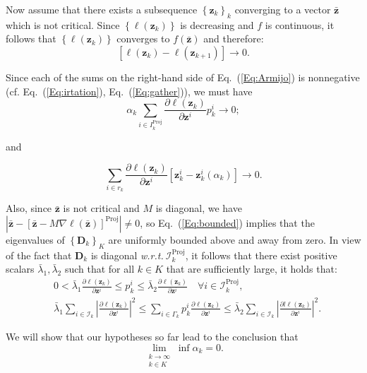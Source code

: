 \documentclass{article}
\theoremstyle{plain}
\theoremstyle{definition}
\def \wrt {\textit{w.r.t.}$\ $}
\def \sI {\mathcal{I}}
\def \D {\mathbf{D}}
\def \z {\mathbf{z}}
\begin{document}
Now assume that there exists a subsequence \(\left\{\z_k\right\}_k\) converging to a vector \(\bar{\z}\) which is not critical. Since \(\left\{\ell\left(\z_k\right)\right\}\) is decreasing and \(f\) is continuous, it follows that \(\left\{\ell\left(\z_k\right)\right\}\) converges to \(f(\bar{\z})\) and therefore: 
\[
\left[\ell\left(\z_k\right)-\ell\left(\z_{k+1}\right)\right] \rightarrow 0.
\]

Since each of the sums on the right-hand side of Eq.~(\ref{Eq:Armijo}) is nonnegative (cf. Eq.~(\ref{Eq:irtation}), Eq.~(\ref{Eq:gather})), we must have
\begin{equation}
\label{Eq:asy0}
    \alpha_k \sum_{i \in I_k^{\operatorname{Proj}}} \frac{\partial \ell\left(\z_k\right)}{\partial \z^i} p_k^i \rightarrow 0; 
\end{equation}

and

\[
\sum_{i \in r_k} \frac{\partial \ell\left(\z_k\right)}{\partial \z^i}\left[\z_k^i - \z_k^i\left(\alpha_k\right)\right] \rightarrow 0.
\]

Also, since \(\bar{\z}\) is not critical and \(M\) is diagonal, we have \(\left|\bar{\z} - [\bar{\z} - M \nabla \ell(\bar{\z})]^{\operatorname{Proj}}\right| \neq 0\), so Eq.~(\ref{Eq:bounded}) implies that the eigenvalues of \(\left\{\D_k\right\}_K\) are uniformly bounded above and away from zero. In view of the fact that \(\D_k\) is diagonal \wrt \(\sI_k^{\operatorname{Proj}}\), it follows that there exist positive scalars \(\bar{\lambda}_1, \bar{\lambda}_2\) such that for all \(k \in K\) that are sufficiently large, it holds that: 
\[
\begin{aligned}
& 0 < \bar{\lambda}_1 \frac{\partial \ell\left(\z_k\right)}{\partial \z^i} \leq p_k^i \leq \bar{\lambda}_2 \frac{\partial \ell\left(\z_k\right)}{\partial \z^i} \quad \forall i \in \sI_k^{\operatorname{Proj}}, \\
& \bar{\lambda}_1 \sum_{i \in \sI_k}\left|\frac{\partial \ell\left(\z_k\right)}{\partial \z^i}\right|^2 \leq \sum_{i \in \Gamma_k} p_k^i \frac{\partial \ell\left(\z_k\right)}{\partial \z^i} \leq \bar{\lambda}_2 \sum_{i \in \sI_k}\left|\frac{\partial l\ell\left(\z_k\right)}{\partial \z^i}\right|^2.
\end{aligned}
\]

We will show that our hypotheses so far lead to the conclusion that
\begin{equation}
\label{Eq:limit}
    \lim _{\substack{k \rightarrow \infty \\ k \in K}} \inf \alpha_k = 0.
\end{equation}
\end{document}
